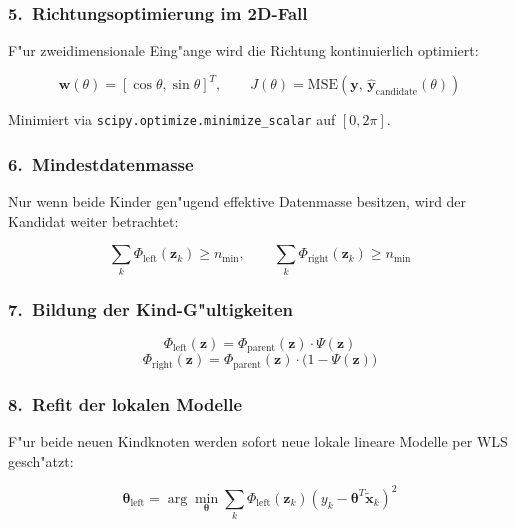 \documentclass[12pt,a4paper]{article}
\begin{document}
\subsubsection*{5.~Richtungsoptimierung im 2D-Fall}

F"ur zweidimensionale Eing"ange wird die Richtung kontinuierlich optimiert:

\begin{equation}
  \mathbf{w}(\theta) = [\cos\theta, \sin\theta]^T, \qquad
  J(\theta) = \mathrm{MSE}(\mathbf{y},\, \hat{\mathbf{y}}_{\mathrm{candidate}}(\theta))
\end{equation}

Minimiert via \texttt{scipy.optimize.minimize\_scalar} auf $[0, 2\pi]$.

\subsubsection*{6.~Mindestdatenmasse}

Nur wenn beide Kinder gen"ugend effektive Datenmasse besitzen, wird der Kandidat weiter betrachtet:

\begin{equation}
  \sum_k \Phi_{\mathrm{left}}(\mathbf{z}_k) \geq n_{\min}, \qquad
  \sum_k \Phi_{\mathrm{right}}(\mathbf{z}_k) \geq n_{\min}
\end{equation}

\subsubsection*{7.~Bildung der Kind-G"ultigkeiten}

\begin{equation}
  \Phi_{\mathrm{left}}(\mathbf{z}) = \Phi_{\mathrm{parent}}(\mathbf{z}) \cdot \Psi(\mathbf{z})
\end{equation}
\begin{equation}
  \Phi_{\mathrm{right}}(\mathbf{z}) = \Phi_{\mathrm{parent}}(\mathbf{z}) \cdot \bigl(1 - \Psi(\mathbf{z})\bigr)
\end{equation}

\subsubsection*{8.~Refit der lokalen Modelle}

F"ur beide neuen Kindknoten werden sofort neue lokale lineare Modelle per WLS gesch"atzt:

\begin{equation}
  \boldsymbol{\theta}_{\mathrm{left}} = \arg\min_{\boldsymbol{\theta}} \sum_k \Phi_{\mathrm{left}}(\mathbf{z}_k) \left(y_k - \boldsymbol{\theta}^T \tilde{\mathbf{x}}_k\right)^2
\end{equation}
\end{document}
